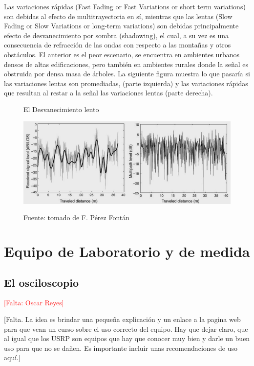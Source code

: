 Las variaciones rápidas (Fast Fading or Fast Variations or short term variations) son debidas al efecto de multitrayectoria en sí, mientras que las lentas (Slow Fading or Slow Variations or long-term variations) son debidas principalmente efecto de desvanecimiento por sombra (shadowing), el cual, a su vez es una consecuencia de refracción de las ondas con respecto a las montañas y otros obstáculos. El anterior es el peor escenario, se encuentra en ambientes urbanos densos de altas edificaciones, pero también en ambientes rurales donde la señal es obstruida por densa masa de árboles. La siguiente figura muestra lo que pasaría si las variaciones lentas son promediadas, (parte izquierda) y las variaciones rápidas que resultan al restar a la señal las variaciones lentas (parte derecha). \\

\begin{figure}[h!]
	\captionsetup{justification = raggedright, singlelinecheck = false}
	\caption{El Desvanecimiento lento} 
	\centering
	\includegraphics[scale=1]{Imagenes/Distancia.png}
	\label{fig:Distancia}
	\caption*{Fuente: tomado de F. Pérez Fontán} 
\end{figure}

\section{Equipo de Laboratorio y de medida}

\subsection{El osciloscopio}
\textcolor{red}{[Falta: Oscar Reyes]} %

[Falta. La idea es brindar una pequeña explicación y un enlace a la pagina web para que vean un curso sobre el uso correcto del equipo. Hay que dejar claro, que al igual que los USRP son equipos que hay que conocer muy bien y darle un buen uso para que no se dañen. Es importante incluir unas recomendaciones de uso aquí.]

